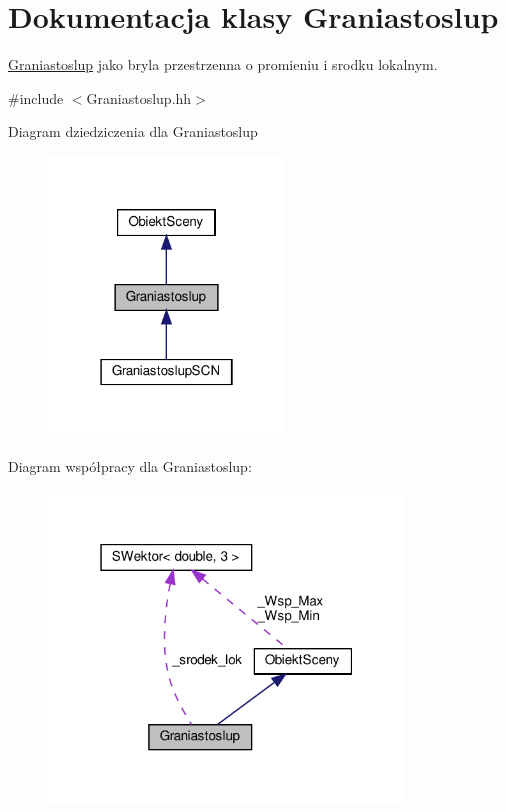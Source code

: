 \hypertarget{classGraniastoslup}{}\section{Dokumentacja klasy Graniastoslup}
\label{classGraniastoslup}


\hyperlink{classGraniastoslup}{Graniastoslup} jako bryla przestrzenna o promieniu i srodku lokalnym.  




{\ttfamily \#include $<$Graniastoslup.\+hh$>$}



Diagram dziedziczenia dla Graniastoslup
\nopagebreak
\begin{figure}[H]
\begin{center}
\leavevmode
\includegraphics[width=178pt]{classGraniastoslup__inherit__graph}
\end{center}
\end{figure}


Diagram współpracy dla Graniastoslup\+:
\nopagebreak
\begin{figure}[H]
\begin{center}
\leavevmode
\includegraphics[width=268pt]{classGraniastoslup__coll__graph}
\end{center}
\end{figure}
